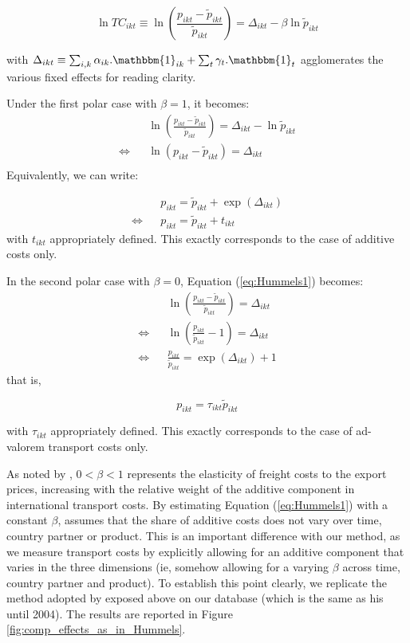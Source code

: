 \documentclass[a4paper,11pt]{article}
\begin{document}
$$\ln TC_{ikt} \equiv \ln \left(\frac{p_{ikt}- \widetilde{p}_{ikt}}{\widetilde{p}_{ikt}} \right) = \Delta_{ikt}- \beta \ln \widetilde{p}_{ikt} $$

\noindent with $\Delta_{ikt} \equiv \sum_{i,k}\alpha_{ik}.\mathbbm{1}_{ik}+ \sum_{t}\gamma_{t}.\mathbbm{1}_{t}$ agglomerates the various fixed effects for reading clarity.

Under the first polar case with $\beta = 1$, it becomes:
\begin{eqnarray*}
&&\ln \left(\frac{p_{ikt}- \widetilde{p}_{ikt}}{\widetilde{p}_{ikt}} \right) = \Delta_{ikt}- \ln \widetilde{p}_{ikt} \\
\Leftrightarrow && \ln (p_{ikt}- \widetilde{p}_{ikt}) = \Delta_{ikt} \\
\end{eqnarray*}
\noindent Equivalently, we can write:

\begin{eqnarray*}
&&p_{ikt} = \widetilde{p}_{ikt} + \exp(\Delta_{ikt})\\
\Leftrightarrow && p_{ikt} = \widetilde{p}_{ikt} + t_{ikt}
\end{eqnarray*}
\noindent with $t_{ikt}$ appropriately defined. This exactly corresponds to the case of additive costs only.

In the second polar case with $\beta = 0$, Equation (\ref{eq:Hummels1}) becomes:
\begin{eqnarray*}
&&\ln \left(\frac{p_{ikt}- \widetilde{p}_{ikt}}{\widetilde{p}_{ikt}} \right) = \Delta_{ikt} \\
\Leftrightarrow && \ln \left(\frac{p_{ikt}}{\widetilde{p}_{ikt}}-1\right) = \Delta_{ikt}\\
\Leftrightarrow && \frac{p_{ikt}}{\widetilde{p}_{ikt}}  = \exp (\Delta_{ikt})+1
\end{eqnarray*}
\noindent that is,

$$p_{ikt} = \tau_{ikt} \widetilde{p}_{ikt}$$

\noindent with $\tau_{ikt}$ appropriately defined. This exactly corresponds to the case of ad-valorem transport costs only.


As noted by \cite{hummels_skiba}, $0<\beta<1$ represents the elasticity of freight costs to the export prices, increasing with the relative weight of the additive component in international transport costs. By estimating Equation (\ref{eq:Hummels1}) with a constant $\beta$, \cite{hummels2007} assumes that the share of additive costs does not vary over time, country partner or product. This is an important difference with our method, as we measure transport costs by explicitly allowing for an additive component that varies in the three dimensions (ie, somehow allowing for a varying $\beta$ across time, country partner and product). To establish this point clearly, we replicate the method adopted by \cite{hummels2007} exposed above on our database (which is the same as his until 2004). The results are reported in Figure \ref{fig:comp_effects_as_in_Hummels}.
\end{document}
